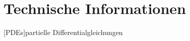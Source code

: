 \chapter{Technische Informationen}
\label{app:TechnischeInfos}
\begin{acronym}[PDE]
[PDEs]{partielle Differentialgleichungen}
\end{acronym}

\begin{acronym}[PD]
\end{acronym}

\begin{acronym}[SPD]
\end{acronym}

\begin{acronym}[RKHR]
\end{acronym}